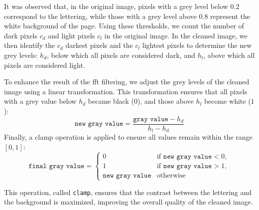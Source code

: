	\begin{modified}
    \noindent It was observed that, in the original image, pixels with a grey level below $0.2$ correspond to the lettering, while those with a grey level above $0.8$ represent the white background of the page. Using these thresholds, we count the number of dark pixels \(c_d\) and light pixels \(c_l\) in the original image. In the cleaned image, we then identify the $c_d$ darkest pixels and the $c_l$ lightest pixels to determine the new grey levels: $h_d$, below which all pixels are considered dark, and $h_l$, above which all pixels are considered light.

    \noindent To enhance the result of the \gls{fft} filtering, we adjust the grey levels of the cleaned image using a linear transformation. This transformation ensures that all pixels with a grey value below $h_d$ became black ($0$), and those above $h_l$ become white ($1$):
    \[
    	\texttt{new gray value} = \frac{\texttt{gray value} - h_d}{h_l - h_d}
    \]
    Finally, a clamp operation is applied to ensure all values remain within the range $[0,1]$:
    \[
    	\texttt{final gray value} = \begin{cases}
    		0 & \text{if } \texttt{new gray value} < 0, \\
    		1 & \text{if } \texttt{new gray value} > 1, \\
    		\texttt{new gray value} & \text{otherwise}
    	\end{cases}
    \]

    \noindent This operation, called \texttt{clamp}, ensures that the contrast between the lettering and the background is maximized, improving the overall quality of the cleaned image.


\end{modified}
